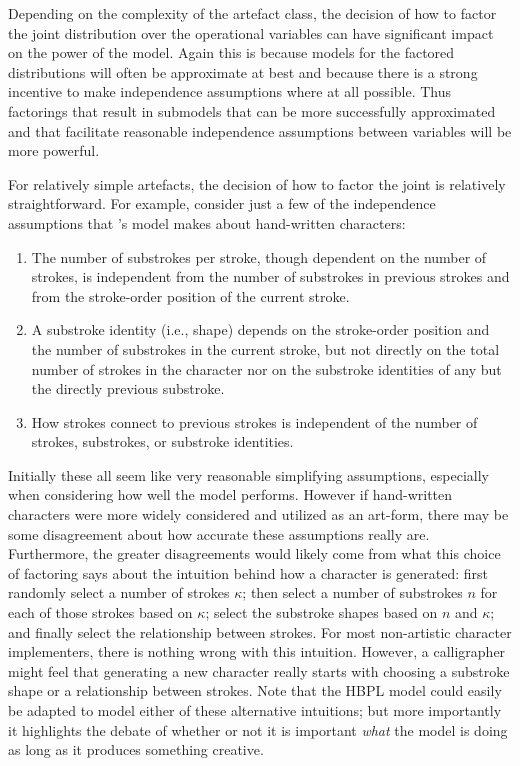 \documentclass[letterpaper]{article}
\begin{document}
Depending on the complexity of the artefact class, the decision of how to factor the joint distribution over the operational variables can have significant impact on the power of the model. Again this is because models for the factored distributions will often be approximate at best and because there is a strong incentive to make independence assumptions where at all possible. Thus factorings that result in submodels that can be more successfully approximated and that facilitate reasonable independence assumptions between variables will be more powerful.

For relatively simple artefacts, the decision of how to factor the joint is relatively straightforward. For example, consider just a few of the independence assumptions that \cite{lake2014thesis}'s model makes about hand-written characters:

\begin{enumerate}  
\item The number of substrokes per stroke, though dependent on the number of strokes, is independent from the number of substrokes in previous strokes and from the stroke-order position of the current stroke.
\item A substroke identity (i.e., shape) depends on the stroke-order position and the number of substrokes in the current stroke, but not directly on the total number of strokes in the character nor on the substroke identities of any but the directly previous substroke.
\item How strokes connect to previous strokes is independent of the number of strokes, substrokes, or substroke identities.
\end{enumerate}

\noindent Initially these all seem like very reasonable simplifying assumptions, especially when considering how well the model performs. However if hand-written characters were more widely considered and utilized as an art-form, there may be some disagreement about how accurate these assumptions really are. Furthermore, the greater disagreements would likely come from what this choice of factoring says about the intuition behind how a character is generated: first randomly select a number of strokes $\kappa$; then select a number of substrokes $n$ for each of those strokes based on $\kappa$; select the substroke shapes based on $n$ and $\kappa$; and finally select the relationship between strokes. For most non-artistic character implementers, there is nothing wrong with this intuition. However, a calligrapher might feel that generating a new character really starts with choosing a substroke shape or a relationship between strokes. Note that the HBPL model could easily be adapted to model either of these alternative intuitions; but more importantly it highlights the debate of whether or not it is important \emph{what} the model is doing as long as it produces something creative.
\end{document}
